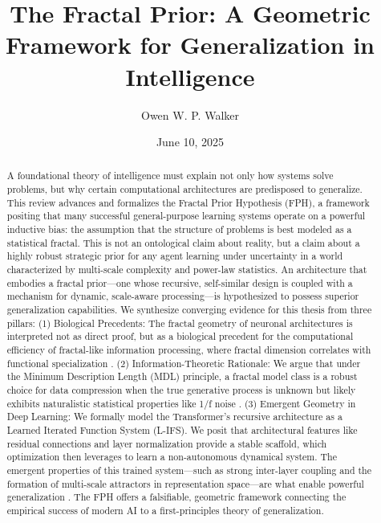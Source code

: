\documentclass[11pt,a4paper]{article}
\title{\textbf{The Fractal Prior: A Geometric Framework for Generalization in Intelligence}}
\author[1]{Owen W. P. Walker}
\affil[1]{Independent Researcher\ \href{mailto:walk9312@mylaurier.ca}{walk9312@mylaurier.ca}}
\date{June 10, 2025}
\begin{document}
\maketitle

\begin{abstract}
\noindent A foundational theory of intelligence must explain not only how systems solve problems, but why certain computational architectures are predisposed to generalize. This review advances and formalizes the Fractal Prior Hypothesis (FPH), a framework positing that many successful general-purpose learning systems operate on a powerful inductive bias: the assumption that the structure of problems is best modeled as a statistical fractal. This is not an ontological claim about reality, but a claim about a highly robust strategic prior for any agent learning under uncertainty in a world characterized by multi-scale complexity and power-law statistics. An architecture that embodies a fractal prior—one whose recursive, self-similar design is coupled with a mechanism for dynamic, scale-aware processing—is hypothesized to possess superior generalization capabilities. We synthesize converging evidence for this thesis from three pillars: (1) Biological Precedents: The fractal geometry of neuronal architectures is interpreted not as direct proof, but as a biological precedent for the computational efficiency of fractal-like information processing, where fractal dimension correlates with functional specialization \cite{grosu2023fractal, smith2021neurons}. (2) Information-Theoretic Rationale: We argue that under the Minimum Description Length (MDL) principle, a fractal model class is a robust choice for data compression when the true generative process is unknown but likely exhibits naturalistic statistical properties like 1/f noise \cite{li2009kolmogorov, gershenson2025self}. (3) Emergent Geometry in Deep Learning: We formally model the Transformer's recursive architecture as a Learned Iterated Function System (L-IFS). We posit that architectural features like residual connections and layer normalization provide a stable scaffold, which optimization then leverages to learn a non-autonomous dynamical system. The emergent properties of this trained system—such as strong inter-layer coupling and the formation of multi-scale attractors in representation space—are what enable powerful generalization \cite{noci2024transformer}. The FPH offers a falsifiable, geometric framework connecting the empirical success of modern AI to a first-principles theory of generalization.
\end{abstract}
\end{document}
